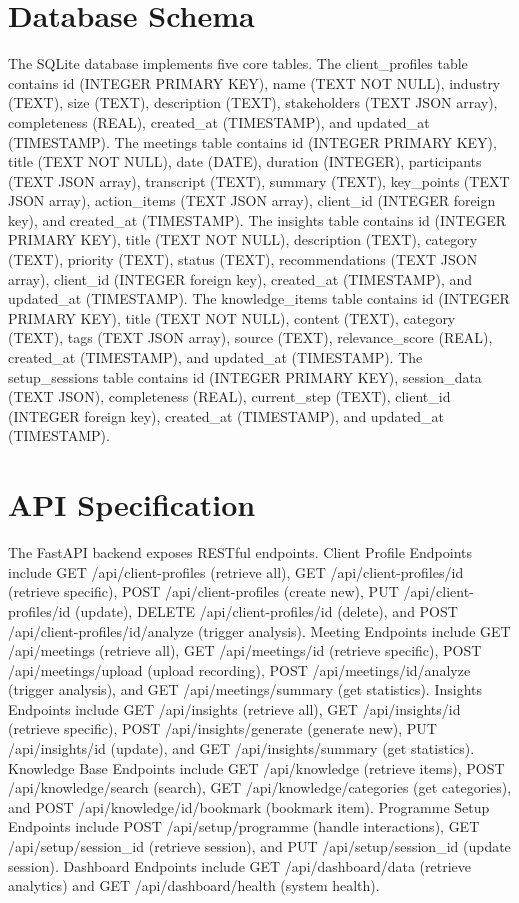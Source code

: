 \documentclass{article}
\begin{document}
\section{Database Schema}
The SQLite database implements five core tables. The client_profiles table contains id (INTEGER PRIMARY KEY), name (TEXT NOT NULL), industry (TEXT), size (TEXT), description (TEXT), stakeholders (TEXT JSON array), completeness (REAL), created_at (TIMESTAMP), and updated_at (TIMESTAMP). The meetings table contains id (INTEGER PRIMARY KEY), title (TEXT NOT NULL), date (DATE), duration (INTEGER), participants (TEXT JSON array), transcript (TEXT), summary (TEXT), key_points (TEXT JSON array), action_items (TEXT JSON array), client_id (INTEGER foreign key), and created_at (TIMESTAMP). The insights table contains id (INTEGER PRIMARY KEY), title (TEXT NOT NULL), description (TEXT), category (TEXT), priority (TEXT), status (TEXT), recommendations (TEXT JSON array), client_id (INTEGER foreign key), created_at (TIMESTAMP), and updated_at (TIMESTAMP). The knowledge_items table contains id (INTEGER PRIMARY KEY), title (TEXT NOT NULL), content (TEXT), category (TEXT), tags (TEXT JSON array), source (TEXT), relevance_score (REAL), created_at (TIMESTAMP), and updated_at (TIMESTAMP). The setup_sessions table contains id (INTEGER PRIMARY KEY), session_data (TEXT JSON), completeness (REAL), current_step (TEXT), client_id (INTEGER foreign key), created_at (TIMESTAMP), and updated_at (TIMESTAMP).

\section{API Specification}
The FastAPI backend exposes RESTful endpoints. Client Profile Endpoints include GET /api/client-profiles (retrieve all), GET /api/client-profiles/{id} (retrieve specific), POST /api/client-profiles (create new), PUT /api/client-profiles/{id} (update), DELETE /api/client-profiles/{id} (delete), and POST /api/client-profiles/{id}/analyze (trigger analysis). Meeting Endpoints include GET /api/meetings (retrieve all), GET /api/meetings/{id} (retrieve specific), POST /api/meetings/upload (upload recording), POST /api/meetings/{id}/analyze (trigger analysis), and GET /api/meetings/summary (get statistics). Insights Endpoints include GET /api/insights (retrieve all), GET /api/insights/{id} (retrieve specific), POST /api/insights/generate (generate new), PUT /api/insights/{id} (update), and GET /api/insights/summary (get statistics). Knowledge Base Endpoints include GET /api/knowledge (retrieve items), POST /api/knowledge/search (search), GET /api/knowledge/categories (get categories), and POST /api/knowledge/{id}/bookmark (bookmark item). Programme Setup Endpoints include POST /api/setup/programme (handle interactions), GET /api/setup/{session_id} (retrieve session), and PUT /api/setup/{session_id} (update session). Dashboard Endpoints include GET /api/dashboard/data (retrieve analytics) and GET /api/dashboard/health (system health).
\end{document}
